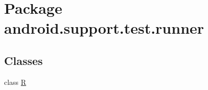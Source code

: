 \hypertarget{namespaceandroid_1_1support_1_1test_1_1runner}{}\section{Package android.\+support.\+test.\+runner}
\label{namespaceandroid_1_1support_1_1test_1_1runner}
\subsection*{Classes}
\begin{DoxyCompactItemize}
\item 
class \mbox{\hyperlink{classandroid_1_1support_1_1test_1_1runner_1_1R}{R}}
\end{DoxyCompactItemize}
